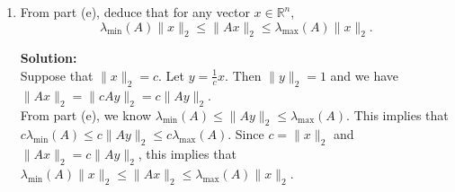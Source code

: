 \documentclass{article}
\newcommand{\solution}{\textbf{Solution: }}
\newcommand{\R}{\mathbb{R}}
\begin{document}
\begin{enumerate}[label=(\alph*)]
    \item From part (e), deduce that for any vector $x \in \R^n$, $$\lambda_{\min}(A) \lVert x \rVert_2 \leq \lVert Ax \rVert_2 \leq \lambda_{\max}(A)\lVert x \rVert_2.$$
    \begin{mdframed}
    \solution\\
    Suppose that $\lVert x \rVert_2 = c$. Let $y=\frac{1}{c}x$. Then $\lVert y \rVert_2 = 1$ and we have\\
    $\lVert Ax \rVert_2=\lVert cAy \rVert_2=c\lVert Ay \rVert_2$.\\
    From part (e), we know $\lambda_{\min}(A) \leq \lVert Ay \rVert_2 \leq \lambda_{\max}(A)$. This implies that\\
    $c\lambda_{\min}(A) \leq c\lVert Ay \rVert_2 \leq c\lambda_{\max}(A)$. Since $c=\lVert x \rVert_2$ and $\lVert Ax \rVert_2=c\lVert Ay \rVert_2$, this implies that\\
    $\lambda_{\min}(A) \lVert x \rVert_2 \leq \lVert Ax \rVert_2 \leq \lambda_{\max}(A)\lVert x \rVert_2$.
    \end{mdframed}
\end{enumerate}

\newpage
\end{document}
